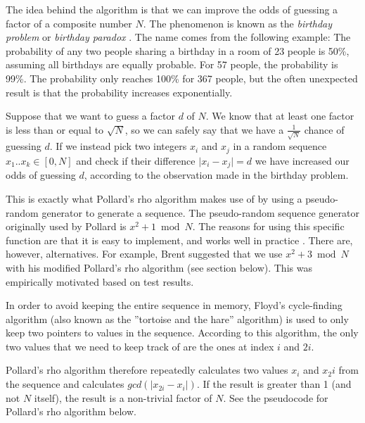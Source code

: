\documentclass[paper=a4, fontsize=11pt,numbers=endperiod]{scrartcl} %
\providecommand{\abs}[1]{\lvert#1\rvert} %
\numberwithin{equation}{section} %
\numberwithin{figure}{section} %
\numberwithin{table}{section} %
\begin{document}
The idea behind the algorithm is that we can improve the odds of guessing a factor of a composite number $N$.
The phenomenon is known as the \emph{birthday problem} or \emph{birthday paradox} \cite{birthday}.
The name comes from the following example: The probability of any two people sharing a birthday in a room of 23 people is 50\%, assuming all birthdays are equally probable.
For 57 people, the probability is 99\%. The probability only reaches 100\% for 367 people, but the often unexpected result is that the probability increases exponentially.

Suppose that we want to guess a factor $d$ of $N$.
We know that at least one factor is less than or equal to $\sqrt{N}$, so we can safely say that we have a $\frac{1}{\sqrt{N}}$ chance of guessing $d$.
If we instead pick two integers $x_i$ and $x_j$ in a random sequence ${x_1 .. x_k} \in [0,N]$ 
and check if their difference $\abs{x_i - x_j} = d$ we have increased our odds of guessing $d$, 
according to the observation made in the birthday problem. 
\cite{birthday2}

This is exactly what Pollard's rho algorithm makes use of by using a pseudo-random generator to generate a sequence.
The pseudo-random sequence generator originally used by Pollard is $x^2 + 1 \bmod N$.
The reasons for using this specific function are that it is easy to implement, and works well in practice \cite{algnotes}.
There are, however, alternatives.
For example, Brent suggested that we use $x^2 +3 \bmod N$ with his modified Pollard's rho algorithm (see section below).
This was empirically motivated based on test results. \cite{brent}

In order to avoid keeping the entire sequence in memory, Floyd's cycle-finding algorithm (also known as the ''tortoise and the hare'' algorithm) is used to only keep two pointers to values in the sequence.
According to this algorithm, the only two values that we need to keep track of are the ones at index $i$ and $2i$. \cite{floyd}

Pollard's rho algorithm therefore repeatedly calculates two values $x_i$ and $x_2i$ from the sequence and calculates $gcd(\abs{x_{2i}-x_i})$.
If the result is greater than 1 (and not $N$ itself), the result is a non-trivial factor of $N$.
See the pseudocode for Pollard's rho algorithm below.
\end{document}
